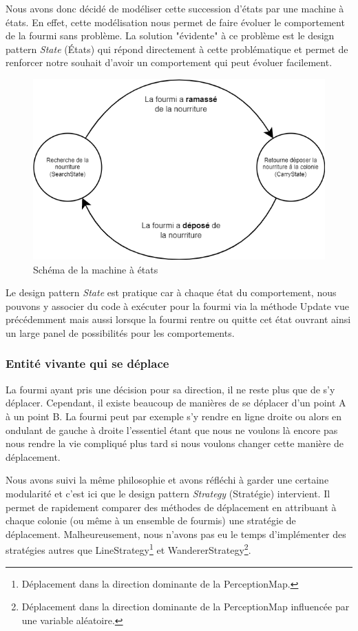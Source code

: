 \documentclass{EPUProjetDi}
\begin{document}
Nous avons donc décidé de modéliser cette succession d'états par une machine à états. En effet, cette modélisation nous permet de faire évoluer 
le comportement de la fourmi sans problème. La solution "évidente" à ce problème est le design pattern \textit{State} (États) qui répond
directement à cette problématique et permet de renforcer notre souhait d'avoir un comportement qui peut évoluer facilement.

\begin{figure}[h]
    \centering
    \includegraphics[scale=0.4]{statemachine.png}
    \caption{Schéma de la machine à états}
    \label{fig:state_machine}
\end{figure}

Le design pattern \textit{State} est pratique car à chaque état du comportement, nous pouvons y associer du code à exécuter pour la fourmi via la méthode 
Update vue précédemment mais aussi lorsque la fourmi rentre ou quitte cet état ouvrant ainsi un large panel de possibilités pour les comportements. 

\subsubsection{Entité vivante qui se déplace}

La fourmi ayant pris une décision pour sa direction, il ne reste plus que de s'y déplacer. Cependant, il existe beaucoup de manières de se déplacer
d'un point A à un point B. La fourmi peut par exemple s'y rendre en ligne droite ou alors en ondulant de gauche à droite l'essentiel étant que nous
ne voulons là encore pas nous rendre la vie compliqué plus tard si nous voulons changer cette manière de déplacement.

Nous avons suivi la même philosophie et avons réfléchi à garder une certaine modularité et c'est ici que le design pattern 
\textit{Strategy} (Stratégie) intervient. Il permet de rapidement comparer des méthodes de déplacement en attribuant à chaque colonie 
(ou même à un ensemble de fourmis) une stratégie de déplacement.
Malheureusement, nous n'avons pas eu le temps d'implémenter des stratégies autres que LineStrategy\footnote{Déplacement dans la direction dominante de la PerceptionMap.} 
et WandererStrategy\footnote{Déplacement dans la direction dominante de la PerceptionMap influencée par une variable aléatoire.}.
\end{document}
